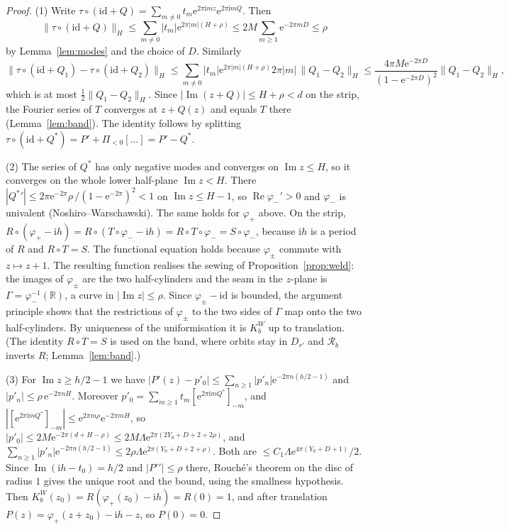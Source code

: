 \documentclass[11pt,a4paper]{article}
\theoremstyle{definition}
\newcommand{\Rr}{R}
\newcommand{\Kk}{K}
\newcommand{\eee}{\mathrm{e}}
\newcommand{\ii}{\mathrm{i}}
\begin{document}
\begin{proof}
(1) Write $\tau\circ(\mathrm{id}+Q)=\sum_{m\ne0}t_m\eee^{2\pi\ii mz}\eee^{2\pi\ii mQ}$.
Then
\[
 \|\tau\circ(\mathrm{id}+Q)\|_H\le\sum_{m\ne0}|t_m|\eee^{2\pi|m|(H+\rho)}
 \le2M\sum_{m\ge1}\eee^{-2\pi mD}\le\rho
\]
by Lemma~\ref{lem:modes} and the choice of $D$.  Similarly
\[
 \|\tau\circ(\mathrm{id}+Q_1)-\tau\circ(\mathrm{id}+Q_2)\|_H\le
 \sum_{m\ne0}|t_m|\eee^{2\pi|m|(H+\rho)}2\pi|m|\,\|Q_1-Q_2\|_H
 \le\frac{4\pi M\eee^{-2\pi D}}{(1-\eee^{-2\pi D})^2}\|Q_1-Q_2\|_H ,
\]
which is at most $\tfrac12\|Q_1-Q_2\|_H$.  Since $|\operatorname{Im}(z+Q)|\le H+\rho<d$
on the strip, the Fourier series of $T$ converges at $z+Q(z)$ and equals $T$
there (Lemma~\ref{lem:band}).  The identity follows by splitting
$\tau\circ(\mathrm{id}+Q^*)=P'+\Pi_{<0}[\ldots]=P'-Q^*$.

(2) The series of $Q^*$ has only negative modes and converges on
$\operatorname{Im}z\le H$, so it converges on the whole lower half-plane
$\operatorname{Im}z<H$.  There $|{Q^*}'|\le2\pi\eee^{-2\pi}\rho\,/(1-\eee^{-2\pi})^2<1$ on
$\operatorname{Im}z\le H-1$, so $\operatorname{Re}\varphi_-'>0$ and $\varphi_-$
is univalent (Noshiro--Warschawski).  The same holds for $\varphi_+$ above.  On
the strip, $\Rr\circ(\varphi_+-\ii h)=\Rr\circ(T\circ\varphi_--\ii h)
=\Rr\circ T\circ\varphi_-=S\circ\varphi_-$, because $\ii h$ is a period of
$\Rr$ and $\Rr\circ T=S$.  The functional equation holds because $\varphi_\pm$
commute with $z\mapsto z+1$.  The resulting function realises the sewing of
Proposition~\ref{prop:weld}: the images of $\varphi_\pm$ are the two
half-cylinders and the seam in the $z$-plane is $\Gamma=\varphi_-^{-1}(\mathbb R)$, a curve in
$|\operatorname{Im}z|\le\rho$.  Since $\varphi_\pm-\mathrm{id}$ is bounded, the
argument principle shows that the restrictions of $\varphi_\pm$ to the two sides of
$\Gamma$ map onto the two half-cylinders.  By uniqueness of the uniformisation
it is $\Kk^W_b$ up to translation.  (The identity $\Rr\circ T=S$ is used on the
band, where orbits stay in $D_{r'}$ and $\mathcal R_b$ inverts $\Rr$;
Lemma~\ref{lem:band}.)

(3) For $\operatorname{Im}z\ge h/2-1$ we have
$|P'(z)-p'_0|\le\sum_{n\ge1}|p'_n|\eee^{-2\pi n(h/2-1)}$ and
$|p'_n|\le\rho\,\eee^{-2\pi nH}$.  Moreover
$p'_0=\sum_{m\ge1}t_m[\eee^{2\pi\ii mQ^*}]_{-m}$, and
$|[\eee^{2\pi\ii mQ^*}]_{-m}|\le\eee^{2\pi m\rho}\eee^{-2\pi mH}$, so
$|p'_0|\le2M\eee^{-2\pi(d+H-\rho)}\le2M\Lambda\eee^{2\pi(2Y_0+D+2+2\rho)}$, and
$\sum_{n\ge1}|p'_n|\eee^{-2\pi n(h/2-1)}\le2\rho\Lambda\eee^{2\pi(Y_0+D+2+\rho)}$.
Both are $\le C_1\Lambda\eee^{4\pi(Y_0+D+1)}/2$.  Since
$\operatorname{Im}(\ii h-t_0)=h/2$ and $|{P'}'|\le\rho$ there, Rouch\'e's theorem
on the disc of radius $1$ gives the unique root and the bound, using the
smallness hypothesis.  Then
$\Kk^W_b(z_0)=\Rr(\varphi_+(z_0)-\ii h)=\Rr(0)=1$, and after translation
$P(z)=\varphi_+(z+z_0)-\ii h-z$, so $P(0)=0$.


\end{proof}
\end{document}
